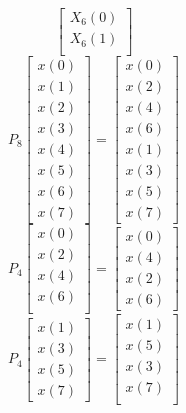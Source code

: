 \documentclass[journal,12pt,twocolumn]{IEEEtran}
\renewcommand\thesection{\arabic{section}}
\begin{document}
\begin{enumerate}[label=\arabic*.,ref=\thesection.\theenumi]
\begin{equation}
\begin{bmatrix}
		X_{6}(0) \\ 
		X_{6}(1) \\ 
	\end{bmatrix}
\end{equation}
\begin{equation}
	P_{8}
	\begin{bmatrix}
		x(0) \\ 
		x(1) \\ 
		x(2) \\ 
		x(3) \\ 
		x(4) \\ 
		x(5) \\
		x(6) \\
		x(7)
	\end{bmatrix}
	= 
	\begin{bmatrix}
		x(0) \\ 
		x(2) \\ 
		x(4) \\ 
		x(6) \\
		x(1) \\ 
		x(3) \\ 
		x(5) \\
		x(7)
	\end{bmatrix}
\end{equation}
\begin{equation}
	P_{4}
	\begin{bmatrix}
		x(0) \\ 
		x(2) \\ 
		x(4) \\ 
		x(6) \\
	\end{bmatrix}
	= 
	\begin{bmatrix}
		x(0) \\ 
		x(4) \\ 
		x(2) \\
		x(6)
	\end{bmatrix}
\end{equation}
\begin{equation}
	P_{4}
	\begin{bmatrix}
		x(1) \\ 
		x(3) \\ 
		x(5) \\
		x(7)
	\end{bmatrix}
	= 
	\begin{bmatrix}
		x(1) \\ 
		x(5) \\ 
		x(3) \\ 
		x(7) \\
	\end{bmatrix}

\end{equation}
\end{enumerate}
\end{document}
